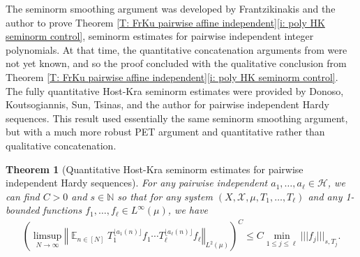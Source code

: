 \documentclass[11pt]{amsart}
\newtheorem{theorem}[lemma]{Theorem}
\theoremstyle{definition}
\DeclareMathOperator*{\E}{\mathbb{E}}
\newcommand{\N}{{\mathbb N}}
\newcommand{\R}{{\mathbb R}}
\newcommand{\CH}{{\mathcal H}}
\newcommand{\CX}{{\mathcal X}}
\newcommand{\norm}[1]{\left\Vert #1\right\Vert}
\newcommand{\nnorm}[1]{\lvert\!|\!| #1|\!|\!\rvert}
\newcommand{\1}{{\mathbf{1}}}
\newcommand{\brac}[1]{\mathopen{}\left( #1 \mathclose{}\right)}
\newcommand{\sfloor}[1]{{\lfloor #1 \rfloor}}
\begin{document}
The seminorm smoothing argument was developed by Frantzikinakis and the author to prove Theorem \ref{T: FrKu pairwise affine independent}\eqref{i: poly HK seminorm control}, seminorm estimates for pairwise independent integer polynomials. At that time, the quantitative concatenation arguments from \cite{DKKST24, KKL24a, Kuc23} were not yet known, and so the proof concluded with the qualitative conclusion from Theorem \ref{T: FrKu pairwise affine independent}\eqref{i: poly HK seminorm control}. The fully quantitative Host-Kra seminorm estimates were provided by Donoso, Koutsogiannis, Sun, Tsinas, and the author \cite[Theorem 1.16]{DKKST24} for pairwise independent Hardy sequences. This result used essentially the same seminorm smoothing argument, but with a much more robust PET argument and quantitative rather than qualitative concatenation.
\begin{theorem}[Quantitative Host-Kra seminorm estimates for pairwise independent Hardy sequences]\label{T: HK estimates for pairwise independent polys}
For any pairwise independent %
$a_1, \ldots, a_\ell\in\CH$, we can find $C>0$ and $s\in\N$ so that for any system $(X, \CX, \mu, T_1, \ldots,T_\ell)$ and any 1-bounded functions $f_1, \ldots, f_\ell\in L^\infty(\mu)$, we have
\begin{align*}
    \brac{\limsup_{N\to\infty}\norm{\E_{n\in[N]}T_1^{\sfloor{a_1(n)}}f_1\cdots T_\ell^{\sfloor{a_\ell(n)}}f_\ell}_{L^2(\mu)}}^C \leq C \min_{1\leq j\leq \ell}\nnorm{f_j}_{s,T_j}.
\end{align*}
\end{theorem}
\end{document}
